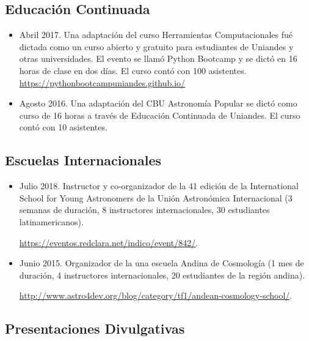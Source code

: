 \documentclass{article}
\begin{document}
\subsection{Educaci\'on Continuada}
\begin{itemize}
\item Abril 2017. Una adaptaci\'on del curso Herramientas Computacionales fu\'e
  dictada como un curso abierto y gratuito para estudiantes de
  Uniandes y otras universidades. El evento se llam\'o Python Bootcamp
  y se dict\'o en 16 horas de clase en dos d\'ias. El curso cont\'o
  con 100 asistentes. \url{https://pythonbootcampuniandes.github.io/}
\item Agosto 2016. Una adaptaci\'on del CBU Astronom\'ia Popular se dict\'o como
  curso de 16 horas a trav\'es de Educaci\'on Continuada de
  Uniandes. El curso cont\'o con 10 asistentes.
\end{itemize}

\subsection{Escuelas Internacionales}
\begin{itemize}

\item {Julio 2018. Instructor y co-organizador de la 41 edici\'on de
  la International School for Young Astronomers de la Uni\'on
  Astron\'omica Internacional (3 semanas de duraci\'on, 8 instructores
  internacionales, 30 estudiantes latinamericanos). 

\url{https://eventos.redclara.net/indico/event/842/}. }

\item {Junio 2015. Organizador de la una escuela Andina de
  Cosmolog\'ia (1 mes de duraci\'on, 4 instructores internacionales,
  20 estudiantes de la regi\'on andina). 

\url{http://www.astro4dev.org/blog/category/tf1/andean-cosmology-school/}. }
\end{itemize}

\subsection{Presentaciones Divulgativas}
\end{document}
